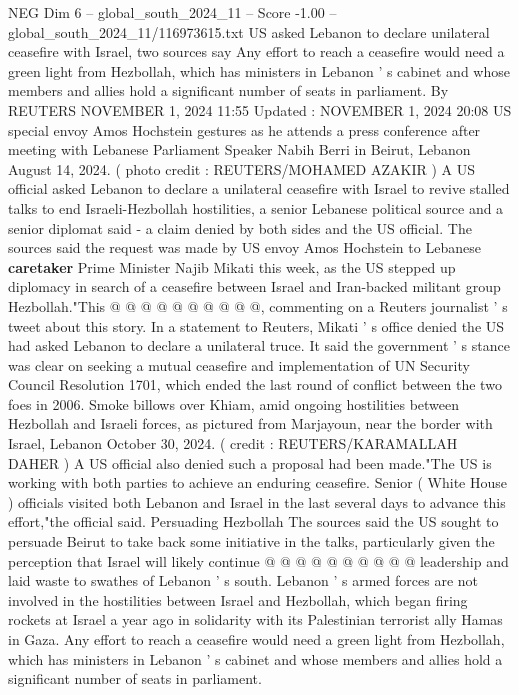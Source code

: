 \begin{textsample}{NEG Dim 6 – global\_south\_2024\_11 – Score -1.00 – global\_south\_2024\_11/116973615.txt}  \label{ex:f6_neg_108}
US asked Lebanon to declare unilateral ceasefire with Israel, two sources say Any effort to reach a ceasefire would need a green light from Hezbollah, which has ministers in Lebanon ' s cabinet and whose members and allies hold a significant number of seats in parliament.
By REUTERS NOVEMBER 1, 2024 11:55 Updated : NOVEMBER 1, 2024 20:08 US special envoy Amos Hochstein gestures as he attends a press conference after meeting with Lebanese Parliament Speaker Nabih Berri in Beirut, Lebanon August 14, 2024. ( photo credit : REUTERS/MOHAMED AZAKIR ) A US official asked Lebanon to declare a unilateral ceasefire with Israel to revive stalled talks to end Israeli-Hezbollah hostilities, a senior Lebanese political source and a senior diplomat said - a claim denied by both sides and the US official.
The sources said the request was made by US envoy Amos Hochstein to Lebanese \textbf{caretaker} Prime Minister Najib Mikati this week, as the US stepped up diplomacy in search of a ceasefire between Israel and Iran-backed militant group Hezbollah."This @ @ @ @ @ @ @ @ @ @, commenting on a Reuters journalist ' s tweet about this story.
In a statement to Reuters, Mikati ' s office denied the US had asked Lebanon to declare a unilateral truce.
It said the government ' s stance was clear on seeking a mutual ceasefire and implementation of UN Security Council Resolution 1701, which ended the last round of conflict between the two foes in 2006.
Smoke billows over Khiam, amid ongoing hostilities between Hezbollah and Israeli forces, as pictured from Marjayoun, near the border with Israel, Lebanon October 30, 2024. ( credit : REUTERS/KARAMALLAH DAHER ) A US official also denied such a proposal had been made."The US is working with both parties to achieve an enduring ceasefire.
Senior ( White House ) officials visited both Lebanon and Israel in the last several days to advance this effort,"the official said.
Persuading Hezbollah The sources said the US sought to persuade Beirut to take back some initiative in the talks, particularly given the perception that Israel will likely continue @ @ @ @ @ @ @ @ @ @ leadership and laid waste to swathes of Lebanon ' s south.
Lebanon ' s armed forces are not involved in the hostilities between Israel and Hezbollah, which began firing rockets at Israel a year ago in solidarity with its Palestinian terrorist ally Hamas in Gaza.
Any effort to reach a ceasefire would need a green light from Hezbollah, which has ministers in Lebanon ' s cabinet and whose members and allies hold a significant number of seats in parliament.

\end{textsample}
